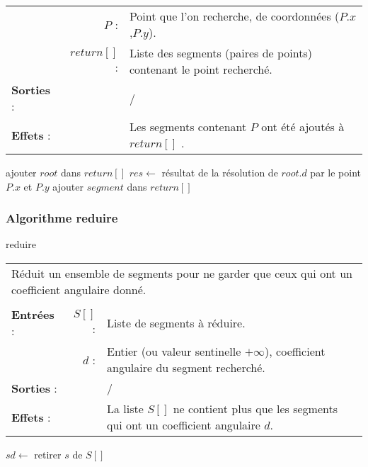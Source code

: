 \documentclass[10pt]{article}
\begin{document}
\begin{algorithm}[H]
\begin{tabular}{lrl}
&$P$ :&Point que l'on recherche, de coordonnées ($P.x$,$P.y$).\\
&$return[]$ :&Liste des segments (paires de points) contenant le point recherché.\\[.25cm]
\textbf{Sorties} :& &/\\[.25cm]
\textbf{Effets} :& &Les segments contenant $P$ ont été ajoutés à $return[]$ .\\[.25cm]
\end{tabular}
\begin{algorithmic}[1]
\State ajouter $root$ dans $return[]$
\EndIf
\Else
\State $res\gets$ résultat de la résolution de $root.d$ par le point $P.x$ et $P.y$
\State {}
\State {}
\Else
{}
\State ajouter $segment$ dans $return[]$
\EndIf
\EndFor
\State{}
\State{}
\EndIf
\EndIf
\EndProcedure
\end{algorithmic}
\end{algorithm}

\subsubsection{Algorithme reduire}
\begin{algorithm}[H]
\caption{reduire}
\begin{tabular}{lrl}
\multicolumn{3}{l}{Réduit un ensemble de segments pour ne garder que ceux qui ont un coefficient angulaire donné.}\\
&&\\
\textbf{Entrées} : &$S[]$ : &Liste de segments à réduire.\\
& $d$ : &Entier (ou valeur sentinelle $+\infty$), coefficient angulaire du segment recherché.\\[.25cm]
\textbf{Sorties} :& &/\\[.25cm]
\textbf{Effets} :& &La liste $S[]$ ne contient plus que les segments qui ont un coefficient angulaire $d$.\\[.25cm]
\end{tabular}
\begin{algorithmic}[1]
\State $sd\gets$
\State retirer $s$ de $S[]$
\EndIf
\EndFor
\EndProcedure
\end{algorithmic}
\end{algorithm}
\end{document}
